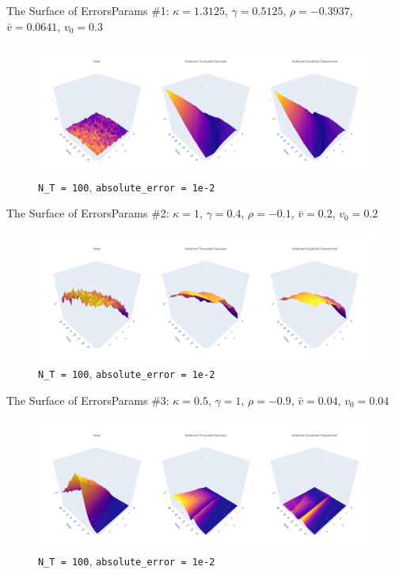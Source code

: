 \begin{frame}{The Surface of Errors}{Params \#1: $\kappa = 1.3125$, $\gamma = 0.5125$, $\rho = -0.3937$, $\bar v = 0.0641$, $v_0 = 0.3$}
    \begin{figure}
        \includegraphics[width=\textwidth]{part4/pictures/err_surface_strike_T_N_T=100_param1.pdf}
        \caption{\texttt{N\_T = 100}, \texttt{absolute\_error = 1e-2}}
    \end{figure}
\end{frame}

\begin{frame}{The Surface of Errors}{Params \#2: $\kappa = 1$, $\gamma = 0.4$, $\rho = -0.1$, $\bar v = 0.2$, $v_0 = 0.2$}
    \begin{figure}
        \includegraphics[width=\textwidth]{part4/pictures/err_surface_strike_T_N_T=100_param2.pdf}
        \caption{\texttt{N\_T = 100}, \texttt{absolute\_error = 1e-2}}
    \end{figure}
\end{frame}

\begin{frame}{The Surface of Errors}{Params \#3: $\kappa = 0.5$, $\gamma = 1$, $\rho = -0.9$, $\bar v = 0.04$, $v_0 = 0.04$}
    \begin{figure}
        \includegraphics[width=\textwidth]{part4/pictures/err_surface_strike_T_N_T=100_param3.pdf}
        \caption{\texttt{N\_T = 100}, \texttt{absolute\_error = 1e-2}}
    \end{figure}
\end{frame}

